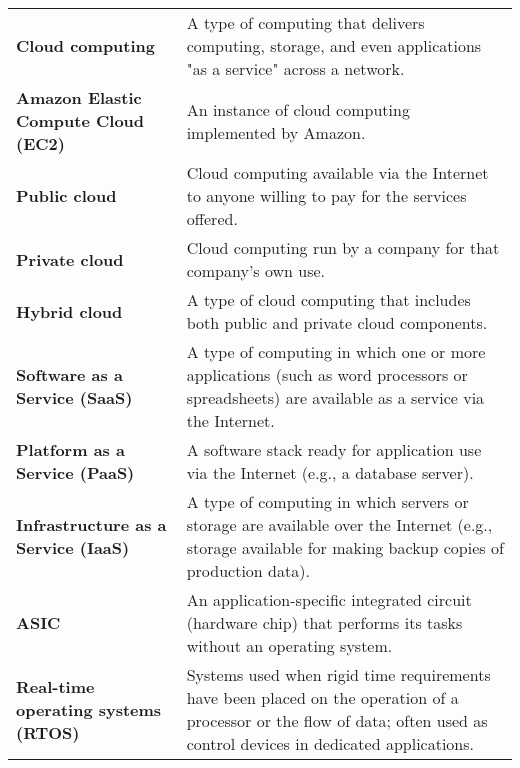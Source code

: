 \documentclass{article}
\begin{document}
\begin{tabular}{>{\raggedright}p{} >{\raggedright\arraybackslash}p{}}
\textbf{Cloud computing} & A type of computing that delivers computing, storage, and even applications "as a service" across a network. \\
\textbf{Amazon Elastic Compute Cloud (EC2)} & An instance of cloud computing implemented by Amazon. \\
\textbf{Public cloud} & Cloud computing available via the Internet to anyone willing to pay for the services offered. \\
\textbf{Private cloud} & Cloud computing run by a company for that company's own use. \\
\textbf{Hybrid cloud} & A type of cloud computing that includes both public and private cloud components. \\
\textbf{Software as a Service (SaaS)} & A type of computing in which one or more applications (such as word processors or spreadsheets) are available as a service via the Internet. \\
\textbf{Platform as a Service (PaaS)} & A software stack ready for application use via the Internet (e.g., a database server). \\
\textbf{Infrastructure as a Service (IaaS)} & A type of computing in which servers or storage are available over the Internet (e.g., storage available for making backup copies of production data). \\
\textbf{ASIC} & An application-specific integrated circuit (hardware chip) that performs its tasks without an operating system. \\
\textbf{Real-time operating systems (RTOS)} & Systems used when rigid time requirements have been placed on the operation of a processor or the flow of data; often used as control devices in dedicated applications. \\
\bottomrule
\end{tabular}
\vspace{\baselineskip}
\newpage
\end{document}
